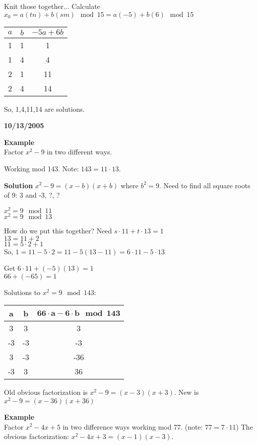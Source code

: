 Knit those together... Calculate
$x_0 = a(tn) + b(sm) \mod 15 = a(-5) + b(6) \mod 15$

\begin{tabular}{|c|c|c|}\hline
$a$ & $b$ & $-5a + 6b$ \\ \hline
1 & 1 & 1 \\ \hline
1 & 4 & 4 \\ \hline
2 & 1 & 11 \\ \hline
2 & 4 & 14 \\ \hline
\end{tabular}

So, 1,4,11,14 are solutions.

\textbf{10/13/2005}

\textbf{Example}\\
Factor $x^2-9$ in two different ways.

Working mod 143. Note: $143 = 11 \cdot 13$.

\textbf{Solution} $x^2 - 9 = (x-b)(x+b)$ where $b^2 = 9$. Need to find all square roots of 9: 3 and -3, ?, ?

$x^2 = 9 \mod 11$\\
$x^2 = 9 \mod 13$

How do we put this together? Need $s \cdot 11 + t \cdot 13  = 1$\\
$13 = 11 + 2$\\
$11 = 5 \cdot 2 + 1$\\
So, $1 = 11 - 5 \cdot 2 = 11 - 5(13 - 11) = 6 \cdot 11 - 5 \cdot 13$

Get $6 \cdot 11 + (-5)(13) = 1$\\
$66 + (-65) = 1$

Solutions to $x^2 = 9 \mod 143$:\\
\begin{tabular}{|c|c|c|} \hline
\textbf{a} & \textbf{b} & $\mathbf{66 \cdot a - 6 \cdot b \mod 143}$\\ \hline
3 & 3 & 3 \\ \hline
-3 & -3 & -3 \\ \hline
3 & -3 & -36 \\ \hline
-3 & 3 & 36 \\ \hline
\end{tabular}

Old obvious factorization is $x^2-9=(x-3)(x+3)$. New is $x^2-9 = (x-36)(x+36)$

\textbf{Example}\\
Factor $x^2-4x+5$ in two difference ways working mod 77. (note: $77 = 7 \cdot 11$) The obvious factorization: $x^2-4x+3 = (x-1)(x-3)$.

